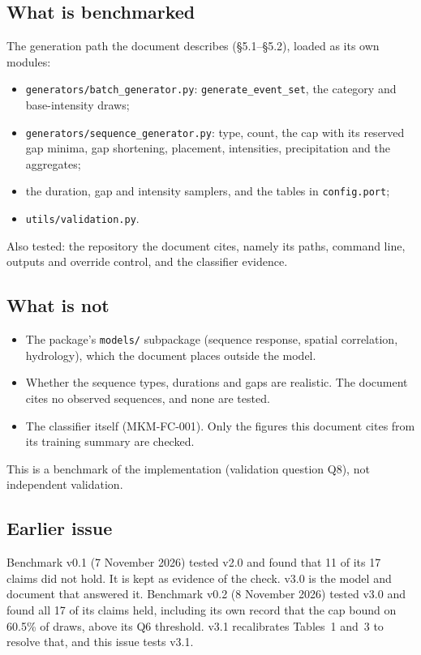 \documentclass[11pt,a4paper]{article}
\begin{document}
\mkmpurpose

\subsection{What is benchmarked}
The generation path the document describes (\S5.1--\S5.2), loaded as its own modules:
\begin{itemize}[leftmargin=*,nosep]
\item \texttt{generators/batch\_generator.py}: \texttt{generate\_event\_set}, the category and
  base-intensity draws;
\item \texttt{generators/sequence\_generator.py}: type, count, the cap with its reserved gap
  minima, gap shortening, placement, intensities, precipitation and the aggregates;
\item the duration, gap and intensity samplers, and the tables in \texttt{config.port};
\item \texttt{utils/validation.py}.
\end{itemize}
Also tested: the repository the document cites, namely its paths, command line, outputs
and override control, and the classifier evidence.

\subsection{What is not}
\begin{itemize}[leftmargin=*,nosep]
\item The package's \texttt{models/} subpackage (sequence response, spatial correlation,
  hydrology), which the document places outside the model.
\item Whether the sequence types, durations and gaps are realistic. The document cites no
  observed sequences, and none are tested.
\item The classifier itself (MKM-FC-001). Only the figures this document cites from its
  training summary are checked.
\end{itemize}
This is a benchmark of the implementation (validation question Q8), not independent
validation.

\subsection{Earlier issue}
Benchmark v0.1 (7 November 2026) tested v2.0 and found that 11 of its 17 claims did not
hold. It is kept as evidence of the check. v3.0 is the model and document that answered
it. Benchmark v0.2 (8 November 2026) tested v3.0 and found all 17 of its claims held,
including its own record that the cap bound on 60.5\% of draws, above its Q6 threshold.
v3.1 recalibrates Tables~1 and~3 to resolve that, and this issue tests v3.1.
\end{document}
